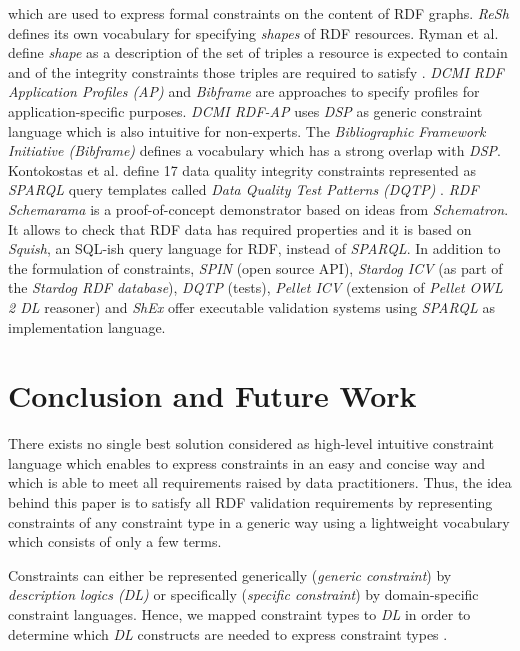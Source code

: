 \documentclass[a4paper,fontsize=11pt]{scrartcl}
\begin{document}
which are used to express formal constraints on the content of RDF graphs.
%
\emph{ReSh} defines its own vocabulary for specifying \emph{shapes} of RDF resources.
Ryman et al. define \emph{shape} as a description of the set of triples a resource is expected to contain and of the integrity constraints those triples are required to satisfy \cite{Ryman2013}. 
%
\emph{DCMI RDF Application Profiles (AP)} and \emph{Bibframe} are approaches to specify profiles for application-specific purposes. 
\emph{DCMI RDF-AP} uses \emph{DSP} as generic constraint language which is also intuitive for non-experts.
The \emph{Bibliographic Framework Initiative (Bibframe)} defines a vocabulary which has a strong overlap with \emph{DSP}.
%
Kontokostas et al. define 17 data quality integrity constraints represented as \emph{SPARQL} query templates called \emph{Data Quality Test Patterns (DQTP)} \cite{Kontokostas2014}. 
%
\emph{RDF Schemarama} 
is a proof-of-concept demonstrator based on ideas from \emph{Schematron}. 
It allows to check that RDF data has required properties and
it is based on \emph{Squish}, an SQL-ish query language for RDF, instead of \emph{SPARQL}. 
%
%
%
In addition to the formulation of constraints, \emph{SPIN} (open source API), \emph{Stardog ICV} (as part of the \emph{Stardog RDF database}), \emph{DQTP} (tests), \emph{Pellet ICV} (extension of \emph{Pellet OWL 2 DL} reasoner) and \emph{ShEx} offer executable validation systems using \emph{SPARQL} as implementation language.

\section{Conclusion and Future Work}

There exists no single best solution considered as high-level intuitive constraint language which enables to express constraints in an easy and concise way and which is able to meet all requirements raised by data practitioners.
Thus, the idea behind this paper is to satisfy all RDF validation requirements
by representing constraints of any constraint type in a generic way using a lightweight vocabulary which consists of only a few terms.

Constraints can either be represented generically (\emph{generic constraint}) by \emph{description logics (DL)} or specifically (\emph{specific constraint}) by domain-specific constraint languages.
Hence, we mapped constraint types to \emph{DL} 
in order to determine which \emph{DL} constructs are needed to express constraint types \cite{BoschNolleAcarEckert2015}.
\end{document}

